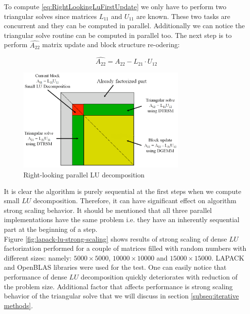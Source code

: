 To compute \ref{eq:RightLookingLuFirstUpdate} we only have to perform two triangular solves since matrices $L_{11}$ and $U_{11}$ are known. These two tasks are concurrent and they can be computed in parallel. Additionally we can notice the triangular solve routine can be computed in parallel too. The next step is to perform $\hat{A_{22}}$ matrix update and block structure re-odering:

\begin{equation} \label{eq:RightLookingLuSecondUpdate}
\hat{A_{22}} = A_{22} - L_{21} \cdot U_{12}
\end{equation}

\figpointer{\ref{fig:RightLookingLuReodering}}
\begin{figure}[htpb]
  \centering
  \includegraphics[width=0.75\textwidth]{figures/chapter-2/right-looking-la.png}
\caption{Right-looking parallel LU decomposition}
\label{fig:RightLookingLuReodering}
\end{figure}


It is clear the algorithm is purely sequential at the first steps when we compute small $LU$ decomposition. Therefore, it can have significant effect on algorithm strong scaling behavior. It should be mentioned that all three parallel implementations have the same problem i.e. they have an inherently sequential part at the beginning of a step. \\

Figure \ref{fig:lapack-lu-strong-scaling} shows results of strong scaling of dense $LU$ factorization performed for a couple of matrices filled with random numbers with different sizes: namely: $5000 \times 5000$, $10000 \times 10000$ and $15000 \times 15000$. LAPACK and OpenBLAS libraries were used for the test. One can easily notice that performance of dense $LU$ decomposition quickly deteriorates with reduction of the problem size. Additional factor that affects performance is strong scaling behavior of the triangular solve that we will discuss in section \ref{subseq:iterative methods}. 

